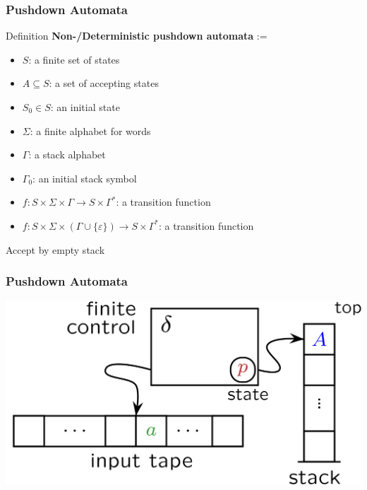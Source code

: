\documentclass[languages_and_machines.tex]{subfiles}
\begin{document}
\begin{frame}
  \frametitle{Pushdown Automata}

  \begin{block}{Definition}
    \textbf{Non-/Deterministic pushdown automata} := \begin{itemize}
    \item \(S\): a finite set of states
    \item \(A \subseteq S\): a set of accepting states
    \item \(S_0 \in S\): an initial state
    \item \(\Sigma\): a finite alphabet for words
    \item \(\Gamma\): a stack alphabet
    \item \(\Gamma_0\): an initial stack symbol
    \item \(f: S \times \Sigma \times \Gamma \to S \times \Gamma^*\): a transition function
      \pause
    \item \(f: S \times \Sigma \times (\Gamma \cup \{\varepsilon\}) \to S \times \Gamma^*\): a transition function
    \end{itemize}
  \end{block}

  \pause
  Accept by empty stack
\end{frame}

\begin{frame}
  \frametitle{Pushdown Automata}

  \includegraphics[width=1.0\textwidth]{pushdown_automata.png}
\end{frame}
\end{document}

